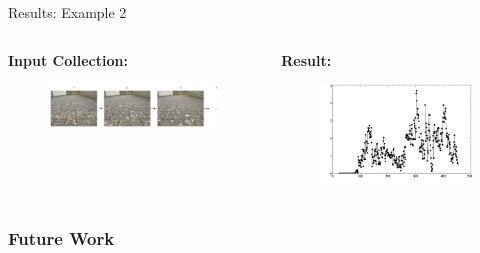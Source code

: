 \documentclass[10pt, compress]{beamer}
\begin{document}
\begin{frame}{Results: Example 2}

\begin{columns}[T] %
\begin{column}{.48\textwidth}

\textbf{Input Collection:}

\begin{figure}[ht!]
\centering
\vspace{0.3cm}
\includegraphics[scale=0.18]{calibimages.png}
\end{figure}

\end{column}%
\hfill%
\begin{column}{.48\textwidth}

\textbf{Result:}
\begin{figure}[ht!]
\centering
\includegraphics[scale=0.22]{wiltshire_outside_10cm.png}
\end{figure}

\end{column}%
\end{columns}

\end{frame}




\begin{frame}[fragile]
  \frametitle{Future Work}

  
\end{frame}
\end{document}
